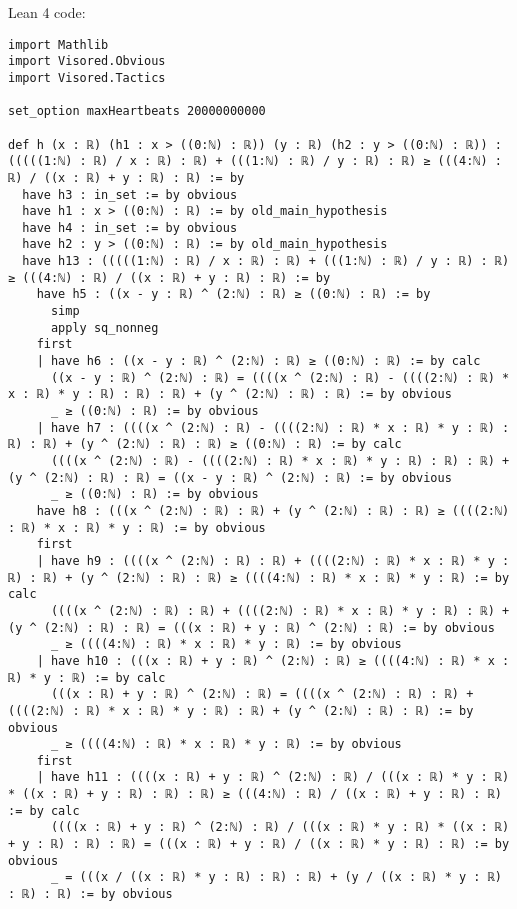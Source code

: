 \documentclass{article}
\begin{document}
Lean 4 code:
\begin{tcolorbox}[colback=white!10, width=\linewidth]
\begin{lstlisting}[language=Lean4]
import Mathlib
import Visored.Obvious
import Visored.Tactics

set_option maxHeartbeats 20000000000

def h (x : ℝ) (h1 : x > ((0:ℕ) : ℝ)) (y : ℝ) (h2 : y > ((0:ℕ) : ℝ)) : (((((1:ℕ) : ℝ) / x : ℝ) : ℝ) + (((1:ℕ) : ℝ) / y : ℝ) : ℝ) ≥ (((4:ℕ) : ℝ) / ((x : ℝ) + y : ℝ) : ℝ) := by
  have h3 : in_set := by obvious
  have h1 : x > ((0:ℕ) : ℝ) := by old_main_hypothesis
  have h4 : in_set := by obvious
  have h2 : y > ((0:ℕ) : ℝ) := by old_main_hypothesis
  have h13 : (((((1:ℕ) : ℝ) / x : ℝ) : ℝ) + (((1:ℕ) : ℝ) / y : ℝ) : ℝ) ≥ (((4:ℕ) : ℝ) / ((x : ℝ) + y : ℝ) : ℝ) := by
    have h5 : ((x - y : ℝ) ^ (2:ℕ) : ℝ) ≥ ((0:ℕ) : ℝ) := by
      simp
      apply sq_nonneg
    first
    | have h6 : ((x - y : ℝ) ^ (2:ℕ) : ℝ) ≥ ((0:ℕ) : ℝ) := by calc
      ((x - y : ℝ) ^ (2:ℕ) : ℝ) = ((((x ^ (2:ℕ) : ℝ) - ((((2:ℕ) : ℝ) * x : ℝ) * y : ℝ) : ℝ) : ℝ) + (y ^ (2:ℕ) : ℝ) : ℝ) := by obvious
      _ ≥ ((0:ℕ) : ℝ) := by obvious
    | have h7 : ((((x ^ (2:ℕ) : ℝ) - ((((2:ℕ) : ℝ) * x : ℝ) * y : ℝ) : ℝ) : ℝ) + (y ^ (2:ℕ) : ℝ) : ℝ) ≥ ((0:ℕ) : ℝ) := by calc
      ((((x ^ (2:ℕ) : ℝ) - ((((2:ℕ) : ℝ) * x : ℝ) * y : ℝ) : ℝ) : ℝ) + (y ^ (2:ℕ) : ℝ) : ℝ) = ((x - y : ℝ) ^ (2:ℕ) : ℝ) := by obvious
      _ ≥ ((0:ℕ) : ℝ) := by obvious
    have h8 : (((x ^ (2:ℕ) : ℝ) : ℝ) + (y ^ (2:ℕ) : ℝ) : ℝ) ≥ ((((2:ℕ) : ℝ) * x : ℝ) * y : ℝ) := by obvious
    first
    | have h9 : ((((x ^ (2:ℕ) : ℝ) : ℝ) + ((((2:ℕ) : ℝ) * x : ℝ) * y : ℝ) : ℝ) + (y ^ (2:ℕ) : ℝ) : ℝ) ≥ ((((4:ℕ) : ℝ) * x : ℝ) * y : ℝ) := by calc
      ((((x ^ (2:ℕ) : ℝ) : ℝ) + ((((2:ℕ) : ℝ) * x : ℝ) * y : ℝ) : ℝ) + (y ^ (2:ℕ) : ℝ) : ℝ) = (((x : ℝ) + y : ℝ) ^ (2:ℕ) : ℝ) := by obvious
      _ ≥ ((((4:ℕ) : ℝ) * x : ℝ) * y : ℝ) := by obvious
    | have h10 : (((x : ℝ) + y : ℝ) ^ (2:ℕ) : ℝ) ≥ ((((4:ℕ) : ℝ) * x : ℝ) * y : ℝ) := by calc
      (((x : ℝ) + y : ℝ) ^ (2:ℕ) : ℝ) = ((((x ^ (2:ℕ) : ℝ) : ℝ) + ((((2:ℕ) : ℝ) * x : ℝ) * y : ℝ) : ℝ) + (y ^ (2:ℕ) : ℝ) : ℝ) := by obvious
      _ ≥ ((((4:ℕ) : ℝ) * x : ℝ) * y : ℝ) := by obvious
    first
    | have h11 : ((((x : ℝ) + y : ℝ) ^ (2:ℕ) : ℝ) / (((x : ℝ) * y : ℝ) * ((x : ℝ) + y : ℝ) : ℝ) : ℝ) ≥ (((4:ℕ) : ℝ) / ((x : ℝ) + y : ℝ) : ℝ) := by calc
      ((((x : ℝ) + y : ℝ) ^ (2:ℕ) : ℝ) / (((x : ℝ) * y : ℝ) * ((x : ℝ) + y : ℝ) : ℝ) : ℝ) = (((x : ℝ) + y : ℝ) / ((x : ℝ) * y : ℝ) : ℝ) := by obvious
      _ = (((x / ((x : ℝ) * y : ℝ) : ℝ) : ℝ) + (y / ((x : ℝ) * y : ℝ) : ℝ) : ℝ) := by obvious

\end{lstlisting}
\end{tcolorbox}
\end{document}
